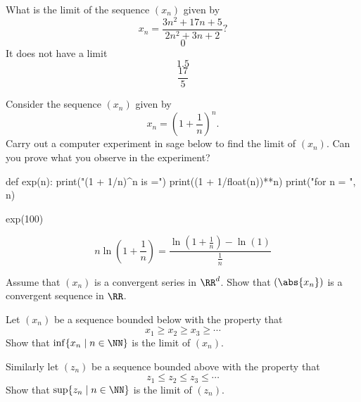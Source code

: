 \documentclass{article}
\begin{document}
\begin{quizexercise}[showhide]
  \begin{quiz}
    \question
    What is the limit of the sequence $(x_n)$ given by
    $$
    x_n = \frac{3 n^2 + 17 n + 5}{2 n^2 + 3 n + 2}?
    $$
    $$0$$
    It does not have a limit
    $$1.5$$
    $$\frac{17}{5}$$
  \end{quiz}
\end{quizexercise}


\beginshex
Consider the sequence $(x_n)$ given by
$$
x_n = \left(1 + \frac{1}{n}\right)^n.
$$
Carry out a computer experiment in sage below to find the limit
of $(x_n)$. Can you prove what you observe in
the experiment?

\begin{sage}
def exp(n):
  print("(1 + 1/n)^n is =")
  print((1 + 1/float(n))**n)
  print("for n = ", n)

exp(100)  
\end{sage}

\begin{hint}
  $$
  n \ln\left(1 + \frac{1}{n}\right) =
  \frac{\ln\left(1 + \frac{1}{n}\right) - \ln(1)}{\frac{1}{n}}
$$
\end{hint}
\endshex



\beginshex
Assume that $(x_n)$ is a convergent series in $\RR^d$. Show that
$(\abs{x_n})$ is a convergent sequence in $\RR$.
\endshex

\beginshex
Let $(x_n)$ be a sequence bounded below with the property that
$$
x_1 \geq x_2 \geq x_3 \geq \cdots
$$
Show that $\inf\{x_n \mid n\in \NN\}$ is the limit of $(x_n)$.

Similarly let $(z_n)$ be a sequence bounded above with the property that
$$
z_1 \leq z_2 \leq z_3 \leq \cdots
$$
Show that $\sup\{z_n \mid n\in \NN\}$ is the limit of $(z_n)$.
\endshex
\end{document}
